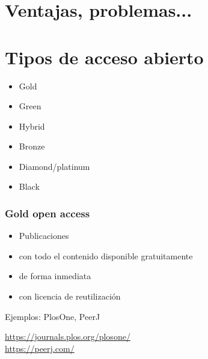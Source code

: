 \documentclass[17pt,aspectratio=169]{beamer}
\begin{document}
\section{Ventajas, problemas...}


\section{Tipos de acceso abierto}

\begin{frame}

\begin{itemize}
\item Gold
\item Green
\item Hybrid
\item Bronze
\item Diamond/platinum
\item Black
\end{itemize}

\end{frame}

\begin{frame}
\frametitle{Gold open access}

\begin{itemize}
\item Publicaciones
\item con todo el contenido disponible gratuitamente
\item de forma inmediata
\item con licencia de reutilización
\end{itemize}

Ejemplos: PlosOne, PeerJ

\begin{flushright}
  \url{https://journals.plos.org/plosone/} \\
  \url{https://peerj.com/} \\
\end{flushright}
\end{frame}
\end{document}
